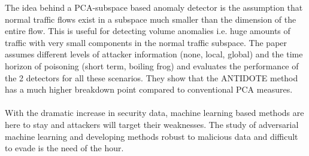 \documentclass[11pt]{article}
\begin{document}
The idea behind a PCA-subspace based anomaly detector is the assumption that normal traffic flows exist in a subspace much smaller than the dimension of the entire flow. This is useful for detecting volume anomalies i.e. huge amounts of traffic with very small components in the normal traffic subspace. The paper assumes different levels of attacker information (none, local, global) and the time horizon of poisoning (short term, boiling frog) and evaluates the performance of the 2 detectors for all these scenarios. They show that the ANTIDOTE method has a much higher breakdown point compared to conventional PCA measures. \\ \\

With the dramatic increase in security data, machine learning based methods are here to stay and attackers will target their weaknesses. The study of adversarial machine learning and developing methods robust to malicious data and difficult to evade is the need of the hour.
\end{document}
